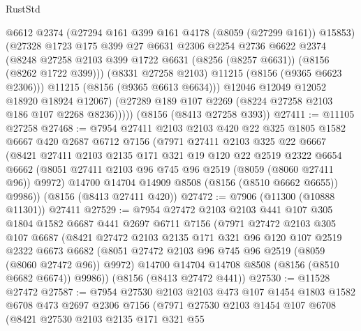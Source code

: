 \begin{lexlean}{RustStd}
\begin{coremodule}
{\begin{coremodule}
{{{{{{{{{{{{{{{{{{{{{{{{{{{{{{{{{{              @6612
              @2374
              (@27294 @161 @399 @161 @4178 (@8059 (@27299 @161)) @15853)
              (@27328
                @1723
                @175
                @399
                @27
                @6631
                @2306
                @2254
                @2736
                @6622
                @2374
                (@8248
                  @27258
                  @2103
                  @399
                  @1722
                  @6631
                  (@8256 (@8257 @6631))
                  (@8156 (@8262 @1722 @399)))
                (@8331 @27258 @2103)
                @11215
                (@8156 (@9365 @6623 @2306)))
              @11215
              (@8156 (@9365 @6613 @6634)))
            @12046
            @12049
            @12052
            @18920
            @18924
            @12067)
          (@27289 @189 @107 @2269 (@8224 @27258 @2103 @186 @107 @2268 @8236)))))
    (@8156 (@8413 @27258 @393))
@27411 := @11105 @27258
@27468 := @7954
    @27411
    @2103
    @2103
    @420
    @22
    @325
    @1805
    @1582
    @6667
    @420
    @2687
    @6712
    @7156
    (@7971
      @27411
      @2103
      @325
      @22
      @6667
      (@8421
        @27411
        @2103
        @2135
        @171
        @321
        @19
        @120
        @22
        @2519
        @2322
        @6654
        @6662
        (@8051 @27411 @2103 @96 @745 @96 @2519 (@8059 (@8060 @27411 @96)) @9972)
        @14700
        @14704
        @14909
        @8508
        (@8156 (@8510 @6662 @6655))
        @9986))
    (@8156 (@8413 @27411 @420))
@27472 := @7906 (@11300 (@10888 @11301)) @27411
@27529 := @7954
    @27472
    @2103
    @2103
    @441
    @107
    @305
    @1804
    @1582
    @6687
    @441
    @2697
    @6711
    @7156
    (@7971
      @27472
      @2103
      @305
      @107
      @6687
      (@8421
        @27472
        @2103
        @2135
        @171
        @321
        @96
        @120
        @107
        @2519
        @2322
        @6673
        @6682
        (@8051 @27472 @2103 @96 @745 @96 @2519 (@8059 (@8060 @27472 @96)) @9972)
        @14700
        @14704
        @14708
        @8508
        (@8156 (@8510 @6682 @6674))
        @9986))
    (@8156 (@8413 @27472 @441))
@27530 := @11528 @27472
@27587 := @7954
    @27530
    @2103
    @2103
    @473
    @107
    @1454
    @1803
    @1582
    @6708
    @473
    @2697
    @2306
    @7156
    (@7971
      @27530
      @2103
      @1454
      @107
      @6708
      (@8421
        @27530
        @2103
        @2135
        @171
        @321
        @55
}}}}}}}}}}}}}}}}}}}}}}}}}}}}}}}}}}
\end{coremodule}}
\end{coremodule}
\end{lexlean}
